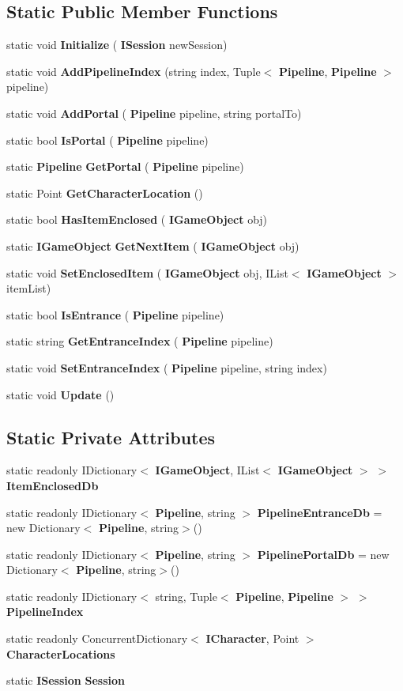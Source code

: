 \subsection*{Static Public Member Functions}
\begin{DoxyCompactItemize}
\item 
static void \textbf{ Initialize} (\textbf{ I\+Session} new\+Session)
\item 
static void \textbf{ Add\+Pipeline\+Index} (string index, Tuple$<$ \textbf{ Pipeline}, \textbf{ Pipeline} $>$ pipeline)
\item 
static void \textbf{ Add\+Portal} (\textbf{ Pipeline} pipeline, string portal\+To)
\item 
static bool \textbf{ Is\+Portal} (\textbf{ Pipeline} pipeline)
\item 
static \textbf{ Pipeline} \textbf{ Get\+Portal} (\textbf{ Pipeline} pipeline)
\item 
static Point \textbf{ Get\+Character\+Location} ()
\item 
static bool \textbf{ Has\+Item\+Enclosed} (\textbf{ I\+Game\+Object} obj)
\item 
static \textbf{ I\+Game\+Object} \textbf{ Get\+Next\+Item} (\textbf{ I\+Game\+Object} obj)
\item 
static void \textbf{ Set\+Enclosed\+Item} (\textbf{ I\+Game\+Object} obj, I\+List$<$ \textbf{ I\+Game\+Object} $>$ item\+List)
\item 
static bool \textbf{ Is\+Entrance} (\textbf{ Pipeline} pipeline)
\item 
static string \textbf{ Get\+Entrance\+Index} (\textbf{ Pipeline} pipeline)
\item 
static void \textbf{ Set\+Entrance\+Index} (\textbf{ Pipeline} pipeline, string index)
\item 
static void \textbf{ Update} ()
\end{DoxyCompactItemize}
\subsection*{Static Private Attributes}
\begin{DoxyCompactItemize}
\item 
static readonly I\+Dictionary$<$ \textbf{ I\+Game\+Object}, I\+List$<$ \textbf{ I\+Game\+Object} $>$ $>$ \textbf{ Item\+Enclosed\+Db}
\item 
static readonly I\+Dictionary$<$ \textbf{ Pipeline}, string $>$ \textbf{ Pipeline\+Entrance\+Db} = new Dictionary$<$\textbf{ Pipeline}, string$>$()
\item 
static readonly I\+Dictionary$<$ \textbf{ Pipeline}, string $>$ \textbf{ Pipeline\+Portal\+Db} = new Dictionary$<$\textbf{ Pipeline}, string$>$()
\item 
static readonly I\+Dictionary$<$ string, Tuple$<$ \textbf{ Pipeline}, \textbf{ Pipeline} $>$ $>$ \textbf{ Pipeline\+Index}
\item 
static readonly Concurrent\+Dictionary$<$ \textbf{ I\+Character}, Point $>$ \textbf{ Character\+Locations}
\item 
static \textbf{ I\+Session} \textbf{ Session}
\end{DoxyCompactItemize}


